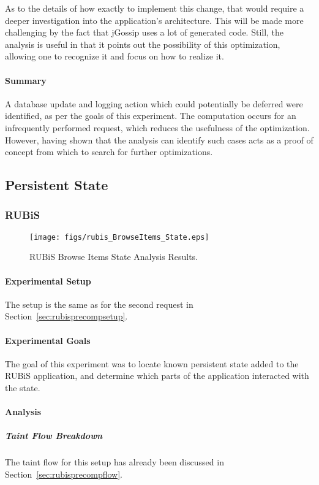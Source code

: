 \documentclass[msc,oneside]{ubcthesis}
\begin{document}
As to the details of how exactly to implement this change, that would require a deeper investigation into the application's architecture. This will be made more challenging by the fact that jGossip uses a lot of generated code. Still, the analysis is useful in that it points out the possibility of this optimization, allowing one to recognize it and focus on how to realize it.

\paragraph{Summary}
A database update and logging action which could potentially be deferred were identified, as per the goals of this experiment. The computation occurs for an infrequently performed request, which reduces the usefulness of the optimization. However, having shown that the analysis can identify such cases acts as a proof of concept from which to search for further optimizations.

\subsection{Persistent State}
\label{ana:pers}
\subsubsection{RUBiS}

\begin{sidewaysfigure}
\centering
\scalebox{0.5}
{\texttt{[image: figs/rubis\_BrowseItems\_State.eps]}}
\caption{RUBiS Browse Items State Analysis Results.} 
\label{fig:browseitemsstate}
\end{sidewaysfigure}

\paragraph{Experimental Setup}
The setup is the same as for the second request in Section~\ref{sec:rubisprecompsetup}.

\paragraph{Experimental Goals}
The goal of this experiment was to locate known persistent state added to the RUBiS application, and determine which parts of the application interacted with the state.

\paragraph{Analysis}
\subparagraph{Taint Flow Breakdown}
The taint flow for this setup has already been discussed in Section~\ref{sec:rubisprecompflow}.
\end{document}
